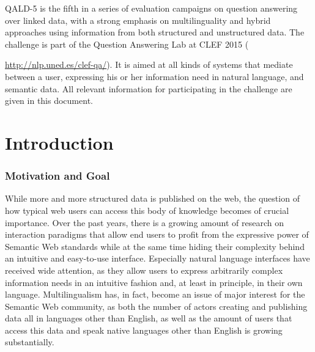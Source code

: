 \documentclass[a4paper]{article}
\begin{document}
QALD-5 is the fifth in a series of evaluation campaigns on question answering over linked data, 
with a strong emphasis on multilinguality and hybrid approaches using information from both structured and unstructured data. 
The challenge is part of the Question Answering Lab at CLEF 2015 ({\url{http://nlp.uned.es/clef-qa/}). 
It is aimed at all kinds of systems that mediate between a user, expressing his or her information need in natural language, and semantic data. 
All relevant information for participating in the challenge are given in this document. 

\vspace{-1.4cm}

\tableofcontents

\newpage

\section{Introduction}

\subsubsection*{Motivation and Goal} 

While more and more structured data is published on the web, the question of how typical web users can access this body of knowledge becomes of crucial importance. Over the past years, there is a growing amount of research on interaction paradigms that allow end users to profit from the expressive power of Semantic Web standards while at the same time hiding their complexity behind an intuitive and easy-to-use interface. Especially natural language interfaces have received wide attention, as they allow users to express arbitrarily complex information needs in an intuitive fashion and, at least in principle, in their own language. Multilingualism has, in fact, become an issue of major interest for the Semantic Web community, as both the number of actors creating and publishing data all in languages other than English, as well as the amount of users that access this data and speak native languages other than English is growing substantially.

}
\end{document}
